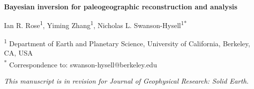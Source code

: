 \documentclass[11pt,letterpaper]{article}
\begin{document}
\begin{flushleft}
{\Large \textbf{Bayesian inversion for paleogeographic reconstruction and analysis}}

Ian R. Rose\textsuperscript{1},
Yiming Zhang\textsuperscript{1},
Nicholas L. Swanson-Hysell\textsuperscript{1}\textsuperscript{*}

\bigskip
\textsuperscript{1} Department of Earth and Planetary Science, University of California, Berkeley, CA, USA\\
\textsuperscript{*} Correspondence to: swanson-hysell@berkeley.edu
\end{flushleft}

\noindent\textit{This manuscript is in revision for Journal of Geophysical Research: Solid Earth.}

\linenumbers

\end{document}
